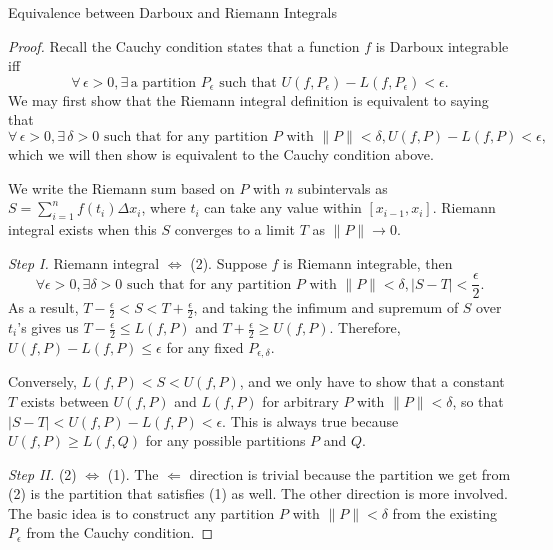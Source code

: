 \documentclass{article}
\newcommand{\nm}[1]{\lVert #1 \rVert}
\newcommand{\abs}[1]{\lvert #1 \rvert}
\begin{document}
\begin{center}
    \sffamily
    \Large Equivalence between Darboux and Riemann Integrals
\end{center}

\begin{proof}
    Recall the Cauchy condition states that a function $f$ is Darboux integrable iff 
    \begin{equation}
        \forall\,\epsilon>0, \exists\,\text{a partition } P_\epsilon \text{ such that } U(f, P_\epsilon) - L(f, P_\epsilon) < \epsilon.
    \end{equation}
    We may first show that the Riemann integral definition is equivalent to saying that
    \begin{equation}
        \forall\,\epsilon > 0, \exists\,\delta > 0 \text{ such that for any partition } P \text{ with } \nm{P} < \delta, U(f, P) - L(f, P) < \epsilon,
    \end{equation}
    which we will then show is equivalent to the Cauchy condition above. 
    
    We write the Riemann sum based on $P$ with $n$ subintervals as $S = \sum_{i = 1}^{n} f(t_i) \Delta x_i$, where $t_i$ can take any value within $[ x_{i-1}, x_{i}]$. Riemann integral exists when this $S$ converges to a limit $T$ as $\nm{P} \to 0$.
    
    \emph{Step I.} Riemann integral $\Longleftrightarrow$ (2).
    Suppose $f$ is Riemann integrable, then $$\forall \epsilon > 0, \exists \delta > 0 \text{ such that for any partition } P \text{ with } \nm{P} < \delta, \abs{S - T} < \frac{\epsilon}{2}.$$
    As a result, $T - \frac{\epsilon}{2} < S < T + \frac{\epsilon}{2}$, and taking the infimum and supremum of $S$ over $t_i$'s gives us $T - \frac{\epsilon}{2} \leq L(f,P)$ and $T + \frac{\epsilon}{2} \geq U(f,P)$. Therefore, $U(f,P) - L(f,P) \leq \epsilon$ for any fixed $P_{\epsilon,\delta}$.
    
    Conversely, $L(f,P) < S < U(f,P)$, and we only have to show that a constant $T$ exists between $U(f,P)$ and $L(f,P)$ for arbitrary $P$ with $\nm{P} < \delta$, so that $\abs{S - T} < U(f,P) - L(f,P) < \epsilon$. This is always true because $U(f,P) \geq L(f,Q)$ for any possible partitions $P$ and $Q$.
    
    \emph{Step II.} (2) $\Longleftrightarrow$ (1). The $\Longleftarrow$ direction is trivial because the partition we get from (2) is the partition that satisfies (1) as well.
    The other direction is more involved. The basic idea is to construct any partition $P$ with $\nm{P} < \delta$ from the existing $P_\epsilon$ from the Cauchy condition.
    

\end{proof}
\end{document}
